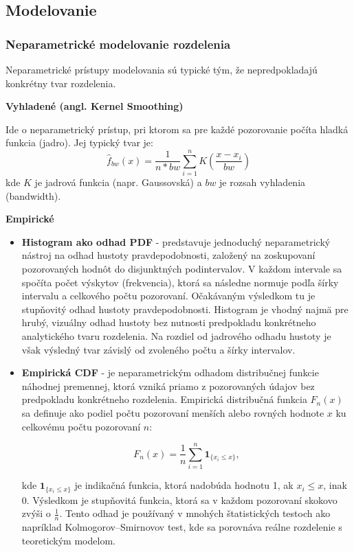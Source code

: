 \subsection{Modelovanie}

\subsubsection{Neparametrické modelovanie rozdelenia}\label{subsubsection:nonparametric_models}

Neparametrické prístupy modelovania sú typické tým, že nepredpokladajú konkrétny tvar rozdelenia.

\textbf{Vyhladené (angl. Kernel Smoothing)}

Ide o neparametrický prístup, pri ktorom sa pre každé pozorovanie počíta hladká funkcia (jadro). Jej typický tvar je:
\begin{equation}
\hat{f}_{bw}(x) = \frac{1}{n*bw} \sum_{i=1}^n K\left( \frac{x - x_i}{bw} \right)
\end{equation}
kde $K$ je jadrová funkcia (napr. Gaussovská) a $bw$ je rozsah vyhladenia (bandwidth).

\textbf{Empirické}

\begin{itemize}
  \item \textbf{Histogram ako odhad PDF} - predstavuje jednoduchý neparametrický nástroj na odhad hustoty pravdepodobnosti, založený na zoskupovaní pozorovaných hodnôt do disjunktných podintervalov. V každom intervale sa spočíta počet výskytov (frekvencia), ktorá sa následne normuje podľa šírky intervalu a celkového počtu pozorovaní. Očakávaným výsledkom tu je stupňovitý odhad hustoty pravdepodobnosti. Histogram je vhodný najmä pre hrubý, vizuálny odhad hustoty bez nutnosti predpokladu konkrétneho analytického tvaru rozdelenia. Na rozdiel od jadrového odhadu hustoty je však výsledný tvar závislý od zvoleného počtu a šírky intervalov.
  \item \textbf{Empirická CDF} - je neparametrickým odhadom distribučnej funkcie náhodnej premennej, ktorá vzniká priamo z pozorovaných údajov bez predpokladu konkrétneho rozdelenia. Empirická distribučná funkcia $F_n(x)$ sa definuje ako podiel počtu pozorovaní menších alebo rovných hodnote $x$ ku celkovému počtu pozorovaní $n$:
  
  \begin{equation}
  F_n(x) = \frac{1}{n} \sum_{i=1}^{n} \mathbf{1}_{\{x_i \leq x\}},
  \end{equation}

  kde $\mathbf{1}_{\{x_i \leq x\}}$ je indikačná funkcia, ktorá nadobúda hodnotu 1, ak $x_i \leq x$, inak 0. Výsledkom je stupňovitá funkcia, ktorá sa v každom pozorovaní skokovo zvýši o $\frac{1}{n}$. Tento odhad je používaný v mnohých štatistických testoch ako napríklad Kolmogorov–Smirnovov test, kde sa porovnáva reálne rozdelenie s teoretickým modelom.
\end{itemize}

